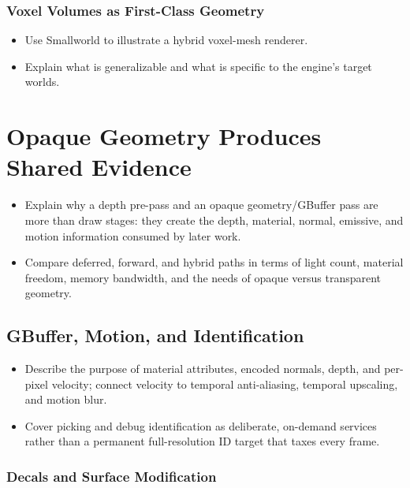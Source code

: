 \documentclass[
  11pt,
  letterpaper,
  DIV=11,
  numbers=noendperiod,
  twoside,
  open=right]{scrreprt}
\providecommand{\tightlist}{%
  \setlength{\itemsep}{0pt}\setlength{\parskip}{0pt}}
\begin{document}
\subsubsection{Voxel Volumes as First-Class
Geometry}\label{voxel-volumes-as-first-class-geometry}

\begin{itemize}
\tightlist
\item
  Use Smallworld to illustrate a hybrid voxel-mesh renderer.
\item
  Explain what is generalizable and what is specific to the engine's
  target worlds.
\end{itemize}

\section{Opaque Geometry Produces Shared
Evidence}\label{opaque-geometry-produces-shared-evidence}

\begin{itemize}
\tightlist
\item
  Explain why a depth pre-pass and an opaque geometry/GBuffer pass are
  more than draw stages: they create the depth, material, normal,
  emissive, and motion information consumed by later work.
\item
  Compare deferred, forward, and hybrid paths in terms of light count,
  material freedom, memory bandwidth, and the needs of opaque versus
  transparent geometry.
\end{itemize}

\subsection{GBuffer, Motion, and
Identification}\label{gbuffer-motion-and-identification}

\begin{itemize}
\tightlist
\item
  Describe the purpose of material attributes, encoded normals, depth,
  and per-pixel velocity; connect velocity to temporal anti-aliasing,
  temporal upscaling, and motion blur.
\item
  Cover picking and debug identification as deliberate, on-demand
  services rather than a permanent full-resolution ID target that taxes
  every frame.
\end{itemize}

\subsubsection{Decals and Surface
Modification}\label{decals-and-surface-modification}
\end{document}
